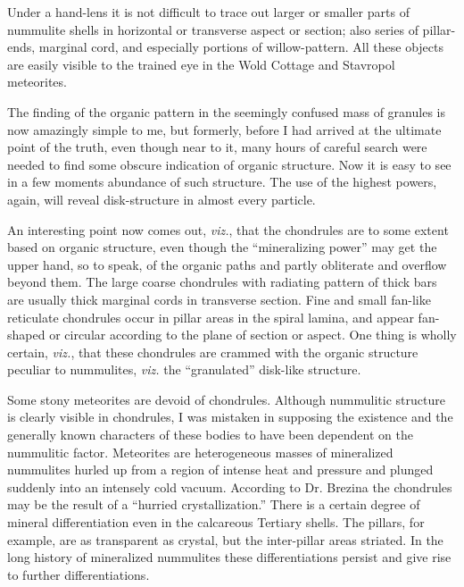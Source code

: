 \documentclass[a4paper, 12pt, oneside, landscape]{article}
\begin{document}
Under a hand-lens it is not difficult to trace out larger or smaller parts of nummulite shells in horizontal or transverse aspect or section; also series of pillar-ends, marginal cord, and especially portions of willow-pattern. All these objects are easily visible to the trained eye in the Wold Cottage and Stavropol meteorites.

The finding of the organic pattern in the seemingly confused mass of granules is now amazingly simple to me, but formerly, before I had arrived at the ultimate point of the truth, even though near to it, many hours of careful search were needed to find some obscure indication of organic structure. Now it is easy to see in a few moments abundance of such structure. The use of the highest powers, again, will reveal disk-structure in almost every particle.

An interesting point now comes out, \emph{viz.}, that the chondrules are to some extent based on organic structure, even though the ``mineralizing power'' may get the upper hand, so to speak, of the organic paths and partly obliterate and overflow beyond them. The large coarse chondrules with radiating pattern of thick bars are usually thick marginal cords in transverse section. Fine and small fan-like reticulate chondrules occur in pillar areas in the spiral lamina, and appear fan-shaped or circular according to the plane of section or aspect. One thing is wholly certain, \emph{viz.}, that these chondrules are crammed with the organic structure peculiar to nummulites, \emph{viz.} the ``granulated'' disk-like structure.

Some stony meteorites are devoid of chondrules. Although nummulitic structure is clearly visible in chondrules, I was mistaken in supposing the existence and the generally known characters of these bodies to have been dependent on the nummulitic factor. Meteorites are heterogeneous masses of mineralized nummulites hurled up from a region of intense heat and pressure and plunged suddenly into an intensely cold vacuum. According to Dr. Brezina the chondrules may be the result of a ``hurried crystallization.'' There is a certain degree of mineral differentiation even in the calcareous Tertiary shells. The pillars, for example, are as transparent as crystal, but the inter-pillar areas striated. In the long history of mineralized nummulites these differentiations persist and give rise to further differentiations.
\end{document}
